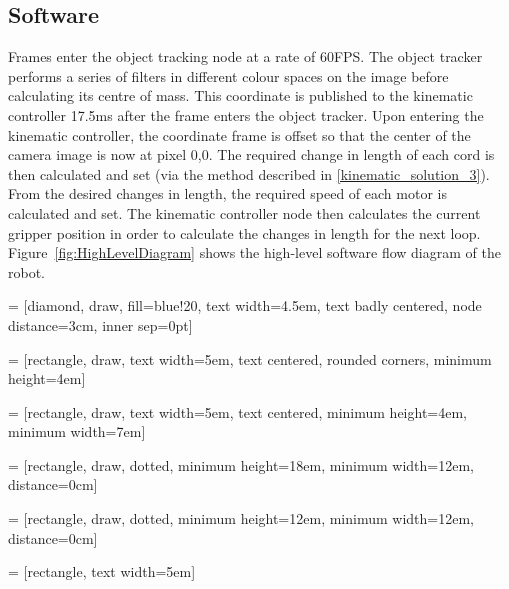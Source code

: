 \documentclass[conference]{IEEEtran}
\begin{document}
	\subsection{Software}
	Frames enter the object tracking node at a rate of 60FPS. The object tracker performs a series of filters in different colour spaces on the image before calculating its centre of mass. This coordinate is published to the kinematic controller 17.5ms after the frame enters the object tracker. Upon entering the kinematic controller, the coordinate frame is offset so that the center of the camera image is now at pixel 0,0. The required change in length of each cord is then calculated and set (via the method described in \ref{kinematic_solution_3}). From the desired changes in length, the required speed of each motor is calculated and set. The kinematic controller node then calculates the current gripper position in order to calculate the changes in length for the next loop.
	Figure~\ref{fig:HighLevelDiagram} shows the high-level software flow diagram of the robot.

	
	
	 = [diamond, draw, fill=blue!20, 
	text width=4.5em, text badly centered, node distance=3cm, inner sep=0pt]
	
	 = [rectangle, draw, 
	text width=5em, text centered, rounded corners, minimum height=4em]
	
	 = [rectangle, draw, 
	text width=5em, text centered, minimum height=4em, minimum width=7em]
	
	 = [rectangle, draw, dotted, minimum height=18em, minimum width=12em, distance=0cm]
	
	 = [rectangle, draw, dotted, minimum height=12em, minimum width=12em, distance=0cm]
	
	 = [rectangle, text width=5em]
	
\end{document}
